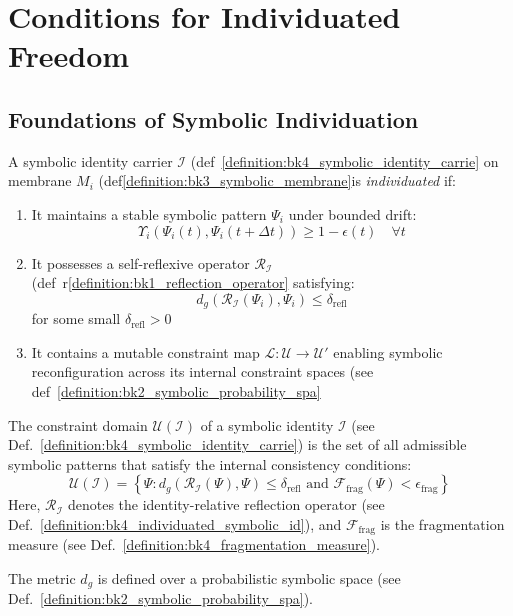 \section{Conditions for Individuated Freedom} \label{sec:bk4_conditions_individuated_freedom}
\subsection{Foundations of Symbolic Individuation} \label{subsec:bk4_foundations_symbolic_individuation}
\begin{definition} \label{definition:bk4_individuated_symbolic_id}
A symbolic identity carrier $\mathcal{I}$ (def~\ref{definition:bk4_symbolic_identity_carrie} on membrane $M_i$ (def\ref{definition:bk3_symbolic_membrane}is \textit{individuated} if:
\begin{enumerate}
    \item It maintains a stable symbolic pattern $\Psi_i$ under bounded drift:
    \begin{equation}
        \Upsilon_i(\Psi_i(t), \Psi_i(t+\Delta t)) \geq 1 - \epsilon(t) \quad \forall t
    \end{equation}
    \item It possesses a self-reflexive operator $\mathcal{R}_{\mathcal{I}}$ (def~r\ref{definition:bk1_reflection_operator} satisfying:
    \begin{equation}
        d_g(\mathcal{R}_{\mathcal{I}}(\Psi_i), \Psi_i) \leq \delta_{\text{refl}}
    \end{equation}
    for some small $\delta_{\text{refl}} > 0$
    \item It contains a mutable constraint map $\mathcal{L}: \mathcal{U} \to \mathcal{U}'$ enabling symbolic reconfiguration across its internal constraint spaces (see def~\ref{definition:bk2_symbolic_probability_spa}
\end{enumerate}
\end{definition}
\begin{definition} 
\label{definition:bk4_constraint_domain}
The constraint domain $\mathcal{U}(\mathcal{I})$ of a symbolic identity $\mathcal{I}$ (see Def.~\ref{definition:bk4_symbolic_identity_carrie}) is the set of all admissible symbolic patterns that satisfy the internal consistency conditions:
\begin{equation}
    \mathcal{U}(\mathcal{I}) = \left\{\Psi : d_g(\mathcal{R}_{\mathcal{I}}(\Psi), \Psi) \leq \delta_{\text{refl}} \text{ and } \mathcal{F}_{\text{frag}}(\Psi) < \epsilon_{\text{frag}} \right\}
\end{equation}
Here, $\mathcal{R}_{\mathcal{I}}$ denotes the identity-relative reflection operator (see Def.~\ref{definition:bk4_individuated_symbolic_id}), and $\mathcal{F}_{\text{frag}}$ is the fragmentation measure (see Def.~\ref{definition:bk4_fragmentation_measure}). 

The metric $d_g$ is defined over a probabilistic symbolic space (see Def.~\ref{definition:bk2_symbolic_probability_spa}).
\end{definition}


